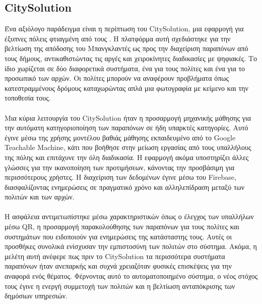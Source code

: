 \subsection{CitySolution}
Ένα αξιόλογο παράδειγμα είναι η περίπτωση του CitySolution, μια εφαρμογή για έξυπνες πόλεις φτιαγμένη από τους \textcite{shama2024citysolution}. Η πλατφόρμα αυτή σχεδιάστηκε για την βελτίωση της απόδοσης του Μπανγκλαντές ως προς την διαχείριση παραπόνων από τους δήμους, αντικαθιστώντας τις αργές και χειροκίνητες διαδικασίες με ψηφιακές. Το ίδιο χωρίζεται σε δύο διαφορετικά συστήματα, ένα για τους πολίτες και ένα για το προσωπικό των αρχών. Οι πολίτες μπορούν να αναφέρουν προβλήματα όπως κατεστραμμένους δρόμους καταχωρώντας απλά μια φωτογραφία με κείμενο και την τοποθεσία τους.
\\
\\
Μια κύρια λειτουργία του CitySolution ήταν η προσαρμογή μηχανικής μάθησης για την αυτόματη κατηγοριοποίηση των παραπόνων σε ήδη υπαρκτές κατηγορίες. Αυτό έγινε μέσω της χρήσης μοντέλου βαθιάς μάθησης εκπαιδευμένο από το Google Teachable Machine, κάτι που βοήθησε στην μείωση εργασίας από τους υπαλλήλους της πόλης και επιτάχυνε την όλη διαδικασία. Η εφαρμογή ακόμα υποστηρίζει άλλες γλώσσες για την ικανοποίηση των προτιμήσεων, κάνοντας την προσβάσιμη για περισσότερους χρήστες. Η διαχείριση των δεδομένων έγινε μέσω του Firebase, διασφαλίζοντας ενημερώσεις σε πραγματικό χρόνο και αλληλεπίδραση μεταξύ των πολιτών και των αρχών. 
\\
\\
Η ασφάλεια αντιμετωπίστηκε μέσω χαρακτηριστικών όπως ο έλεγχος των υπαλλήλων μέσω QR, η προσαρμογή παρακολούθησης των παραπόνων για τους πολίτες και συστημάτων που ειδοποιούν για ενημερώσεις της κατάσταστης τους. Αυτές οι προσθήκες συνολικά ενίσχυσαν την εμπιστοσύνη των πολιτών στο σύστημα. Ακόμα, η μελέτη αυτή ανέφερε πως πριν το CitySolution τα περισσότερα συστήματα παραπόνων ήταν ανεπαρκής και συχνά χρειαζόταν φυσικές επισκέψεις για την αναφορά ενός θέματος. Φέρνοντας αυτό το αυτοματοποιημένο σύστημα, ο νέος στόχος τους έγινε η ενεργή συμμετοχή των πολιτών και η βελτίωση ανταπόκρισης των δημόσιων υπηρεσιών.

